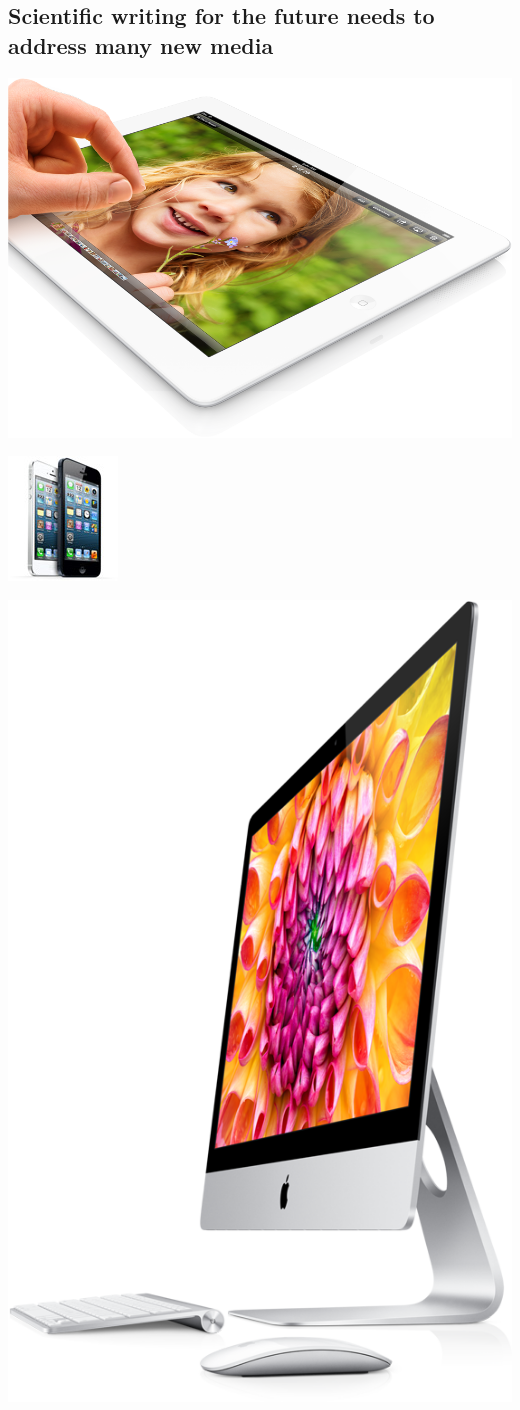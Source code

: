 \documentclass[%
oneside,                 %
final,                   %
10pt]{article}
\begin{document}
\subsection{Scientific writing for the future needs to address many new media}
\vspace{6mm}
\centerline{\includegraphics[width=0.8\linewidth]{testfigs/ipad.png}}
\vspace{6mm}
\vspace{6mm}
\centerline{\includegraphics[width=0.3\linewidth]{testfigs/iphones.jpg}}
\vspace{6mm}
\vspace{6mm}
\centerline{\includegraphics[width=0.7\linewidth]{testfigs/imac.png}}
\end{document}
